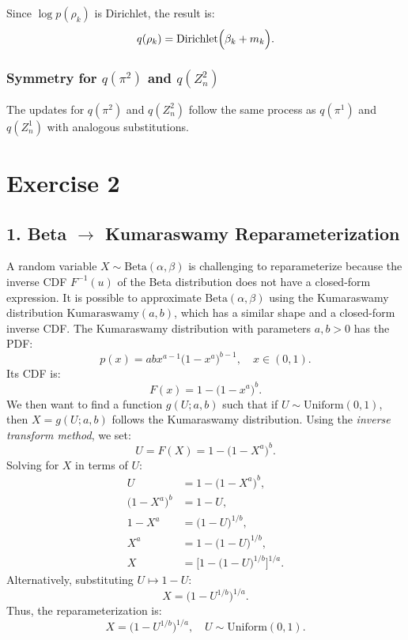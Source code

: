 \documentclass{article}
\begin{document}
Since \(\log p(\rho_k)\) is Dirichlet, the result is:
\[
q(\rho_k) = \mathrm{Dirichlet}\Bigl(\beta_k + m_k\Bigr).
\]

\subsubsection*{Symmetry for \(q(\pi^2)\) and \(q(Z_n^2)\)}
The updates for \(q(\pi^2)\) and \(q(Z_n^2)\) follow the same process as \(q(\pi^1)\) and \(q(Z_n^1)\) with analogous substitutions.

\section*{Exercise 2}
\subsection*{1. Beta \(\rightarrow\) Kumaraswamy Reparameterization}

A random variable \(X \sim \mathrm{Beta}(\alpha, \beta)\) is challenging to reparameterize because the inverse CDF \(F^{-1}(u)\) of the Beta distribution does not have a closed-form expression.
It is possible to approximate \(\mathrm{Beta}(\alpha, \beta)\) using the Kumaraswamy distribution \(\mathrm{Kumaraswamy}(a, b)\), which has a similar shape and a closed-form inverse CDF.
The Kumaraswamy distribution with parameters \(a, b > 0\) has the PDF:
\[
p(x) = a b x^{a-1} \bigl( 1 - x^a \bigr)^{b-1}, \quad x \in (0, 1).
\]
Its CDF is:
\[
F(x) = 1 - \bigl( 1 - x^a \bigr)^b.
\]
We then want to find a function \(g(U; a, b)\) such that if \(U \sim \mathrm{Uniform}(0, 1)\), then \(X = g(U; a, b)\) follows the Kumaraswamy distribution. Using the \textit{inverse transform method}, we set:
\[
U = F(X) = 1 - \bigl( 1 - X^a \bigr)^b.
\]
Solving for \(X\) in terms of \(U\):
\begin{align*}
U &= 1 - \bigl( 1 - X^a \bigr)^b, \\
\bigl( 1 - X^a \bigr)^b &= 1 - U, \\
1 - X^a &= \bigl( 1 - U \bigr)^{1/b}, \\
X^a &= 1 - \bigl( 1 - U \bigr)^{1/b}, \\
X &= \bigl[ 1 - \bigl( 1 - U \bigr)^{1/b} \bigr]^{1/a}.
\end{align*}
Alternatively, substituting \(U \mapsto 1 - U\):
\[
X = \bigl( 1 - U^{1/b} \bigr)^{1/a}.
\]
Thus, the reparameterization is:
\[
\boxed{X = \bigl( 1 - U^{1/b} \bigr)^{1/a}, \quad U \sim \mathrm{Uniform}(0, 1).}
\]
\end{document}
